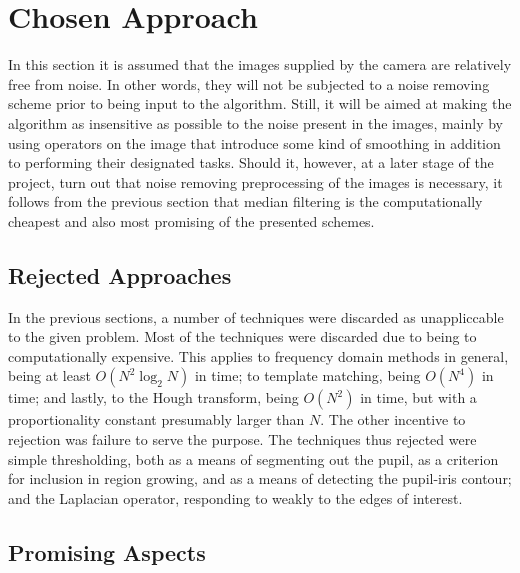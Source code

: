 
\section{Chosen Approach}
\label{eval:approach}

In this section it is assumed that the images supplied by the camera
are relatively free from noise.  In other words, they will not be
subjected to a noise removing scheme prior to being input to the
algorithm.  Still, it will be aimed at making the algorithm as
insensitive as possible to the noise present in the images, mainly by
using operators on the image that introduce some kind of smoothing in
addition to performing their designated tasks.  Should it, however, at
a later stage of the project, turn out that noise removing
preprocessing of the images is necessary, it follows from the previous
section that median filtering is the computationally cheapest and also
most promising of the presented schemes.

\subsection{Rejected Approaches}
\label{eval:approach:reject}

In the previous sections, a number of techniques were discarded as
unappliccable to the given problem.  Most of the techniques were
discarded due to being to computationally expensive.  This applies to
frequency domain methods in general, being at least
$O(N^{2}\log_{2}N)$ in time; to template matching, being $O(N^{4})$ in
time; and lastly, to the Hough transform, being $O(N^{2})$ in time,
but with a proportionality constant presumably larger than $N$.  The
other incentive to rejection was failure to serve the purpose.  The
techniques thus rejected were simple thresholding, both as a means of
segmenting out the pupil, as a criterion for inclusion in region
growing, and as a means of detecting the pupil-iris contour; and the
Laplacian operator, responding to weakly to the edges of interest.

\subsection{Promising Aspects}
\label{eval:approach:aspect}

